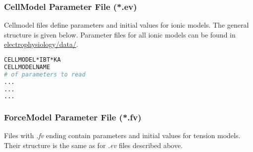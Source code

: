 \subsubsection{CellModel Parameter File (*.ev)}
\label{files:ionmodel}

Cellmodel files define parameters and initial values for ionic models.
The general structure is given below.
Parameter files for all ionic models can be found in \href{https://github.com/KIT-IBT/CardioMechanics/tree/main/electrophysiology/data}{electrophysiology/data/}.

\begin{lstlisting}[language=Bash,caption=Ionic model parameter file (*.ev)]
CELLMODEL*IBT*KA
CELLMODELNAME
# of parameters to read
...
...
...
\end{lstlisting}

\subsubsection{ForceModel Parameter File (*.fv)}

Files with \emph{.fv} ending contain parameters and initial values for tension models.
Their structure is the same as for \emph{.ev} files described above.